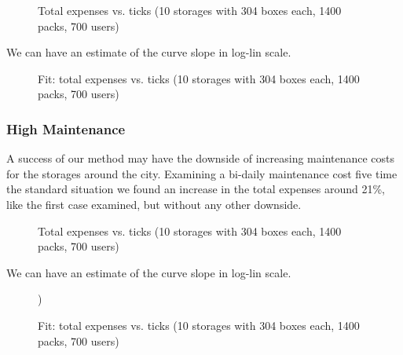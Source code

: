 \documentclass[11pt,a4paper]{article}
\begin{document}
\begin{figure}[h!]
\centering
\caption{Total expenses vs. ticks (10 storages with 304 boxes each, 1400 packs, 700 users)}
\end{figure}

We can have an estimate of the curve slope in log-lin scale.

\begin{figure}[h!]
\centering
\caption{Fit: total expenses vs. ticks (10 storages with 304 boxes each, 1400 packs, 700 users)}
\end{figure}

\newpage
\subsubsection*{High Maintenance}
A success of our method may have the downside of increasing maintenance costs for the storages around the city.
Examining a bi-daily maintenance cost five time the standard situation we found an increase in the total expenses around 21\%, like the first case examined, but without any other downside.

\begin{figure}[h!]
\centering
\caption{Total expenses vs. ticks (10 storages with 304 boxes each, 1400 packs, 700 users)}
\end{figure}

We can have an estimate of the curve slope in log-lin scale.

\begin{figure}[h!]
\centering
\caption{Fit: total expenses vs. ticks (10 storages with 304 boxes each, 1400 packs, 700 users)})
\end{figure}

\newpage
\end{document}
